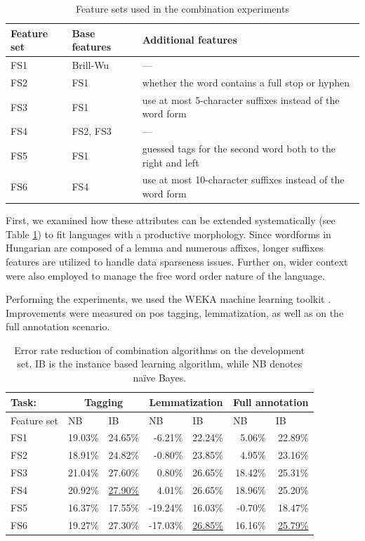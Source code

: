\begin{table}[H]
\centering
\caption{Feature sets used in the combination experiments}\label{tab:comb-feature-sets}
\begin{tabular}{l l l}
\hline
Feature set & Base features & Additional features \\
\hline
FS1 & Brill-Wu & --- \\
FS2 & FS1 & whether the word contains a full stop or hyphen \\
FS3 & FS1 & use at most 5-character suffixes instead of the word form \\
FS4 & FS2, FS3 & --- \\ 
FS5 & FS1 & guessed tags for the second word both to the right and left \\
FS6 & FS4 & use at most 10-character suffixes instead of the word form \\
\hline
\end{tabular}
\end{table}

First, we examined how these attributes can be extended systematically (see Table \ref{tab:comb-feature-sets}) to fit languages with a productive morphology.
Since wordforms in Hungarian are composed of a lemma and numerous affixes, longer suffixes features are utilized to handle data sparseness issues.
Further on, wider context were also employed to manage the free word order nature of the language. 


Performing the experiments, we used the WEKA machine learning toolkit \cite{Hall2009}.
Improvements were measured on \acrshort{pos} tagging, lemmatization, as well as on the full annotation scenario.

\begin{table}[H]
\centering
\caption{Error rate reduction of combination algorithms on the development set. IB is the instance based learning algorithm, while NB denotes naïve Bayes.}\label{tab:comb-reduction-rates}
\begin{tabular}{l r r r r r r}
\hline
Task:& \multicolumn{2}{c}{Tagging} & \multicolumn{2}{c}{Lemmatization} & \multicolumn{2}{c}{Full annotation} \\
\hline
Feature set & \multicolumn{1}{l}{NB} & \multicolumn{1}{l}{IB} & \multicolumn{1}{l}{NB} & \multicolumn{1}{l}{IB} & \multicolumn{1}{l}{NB} & \multicolumn{1}{l}{IB} \\
\hline
FS1 & 19.03\% & 24.65\% & -6.21\% & 22.24\% & 5.06\% & 22.89\% \\
FS2 & 18.91\% & 24.82\% & -0.80\% & 23.85\% & 4.95\% & 23.16\% \\
FS3 & 21.04\% & 27.60\% & 0.80\% & 26.65\% & 18.42\% & 25.31\% \\
FS4 & 20.92\% & \underline{27.90\%} & 4.01\% & 26.65\% & 18.96\% & 25.20\% \\
FS5 & 16.37\% & 17.55\% & -19.24\% & 16.03\% & -0.70\% & 18.47\% \\
FS6 & 19.27\% & 27.30\% & -17.03\% & \underline{26.85\%} & 16.16\% & \underline{25.79\%} \\
\hline
\end{tabular}
\end{table}


